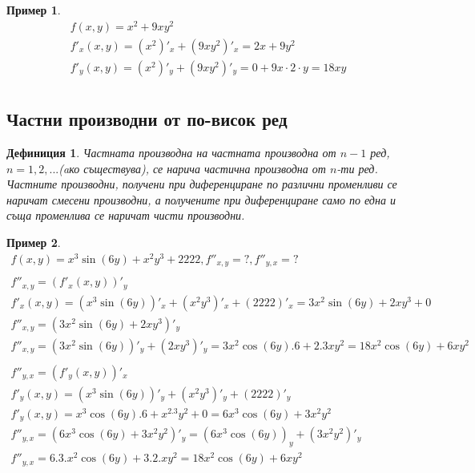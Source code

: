 \documentclass[a4paper,fleqn,12pt]{article}
\newtheorem{definition}{Дефиниция}[subsection]
\newtheorem{example}{Пример}[subsection]
\begin{document}
\begin{example}
\begin{gather*}
f(x,y) = x^2 + 9xy^2\\
f'_x (x,y) = (x^2)'_x+(9xy^2)'_x = 2x + 9y^2\\
f'_y (x,y) = (x^2)'_y+(9xy^2)'_y = 0 + 9x \cdot 2 \cdot y = 18xy \\
\end{gather*}
\end{example}

\subsection{Частни производни от по-висок ред}

\begin{definition}
Частната производна на частната производна от $n-1$ ред, $n = 1, 2, ...$(aко съществува), се нарича частична производна от $n$-ти ред. Частните производни, получени при диференциране по различни променливи се наричат смесени производни, а получените при диференциране само по една и съща променлива се наричат чисти производни. 
\end{definition}

\begin{example}
\begin{gather*}
f(x,y) = x^3\sin(6y) + x^2y^3 + 2222, f''_{x,y} = ?, f''_{y,x} = ? \\
\\
f''_{x,y} = (f'_x(x,y))'_y\\
f'_x(x,y) =(x^3\sin(6y))'_x + (x^2y^3)'_x + (2222)'_x = 3x^2 \sin(6y) + 2xy^3 + 0 \\
f''_{x,y} = (3x^2 \sin(6y) + 2xy^3)'_y \\
f''_{x,y} = (3x^2 \sin(6y))'_y + (2xy^3)'_y  =3x^2 \cos(6y).6 + 2.3xy^2 = 18x^2\cos(6y) + 6xy^2\\
\\
f''_{y,x} = (f'_y(x,y))'_x\\
f'_y (x,y) =(x^3\sin(6y))'_y + (x^2y^3)'_y + (2222)'_y \\
f'_y (x,y) = x^3 \cos(6y).6 + x^2.3y^2 + 0 = 6x^3 \cos(6y) + 3x^2y^2 \\
f''_{y,x} = (6x^3 \cos(6y) + 3x^2y^2)'_y = (6x^3 \cos(6y))_y + (3x^2y^2)'_y \\
f''_{y,x} = 6.3.x^2 \cos(6y) + 3.2.xy^2 = 18x^2\cos(6y) + 6xy^2 \\
\end{gather*}
\end{example}
\end{document}
